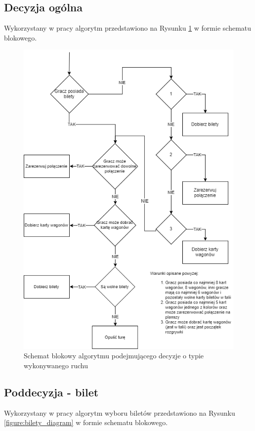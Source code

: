\documentclass[12pt, oneside]{report}
\begin{document}
\subsection{Decyzja ogólna}
Wykorzystany w pracy algorytm przedstawiono na Rysunku \ref{figure:alg_diagram} w formie schematu blokowego.
\begin{figure}[h]
	\centering
	\includegraphics[height=0.6\textheight]{MainAlgorithm2.png}
	\caption{Schemat blokowy algorytmu podejmującego decyzje o typie wykonywanego ruchu}
	\label{figure:alg_diagram}
\end{figure}
\subsection{Poddecyzja - bilet}
Wykorzystany w pracy algorytm wyboru biletów przedstawiono na Rysunku \ref{figure:bilety_diagram} w formie schematu blokowego.
\end{document}
